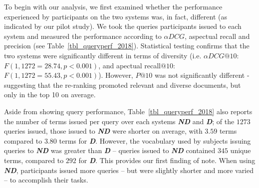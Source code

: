 To begin with our analysis, we first examined whether the performance experienced by participants on the two systems was, in fact, different (as indicated by our pilot study). We took the queries participants issued to each system and measured the performance according to $\alpha DCG$, aspectual recall and precision (see Table~\ref{tbl_queryperf_2018}). Statistical testing confirms that the two systems were significantly different 
 in terms of diversity (i.e. $\alpha DCG@10$: $F(1, 1272=28.74, p<0.001)$, and apectual recall$@10$: $F(1, 1272=55.43, p<0.001)$). However, $P@10$ was not significantly different - suggesting that the re-ranking promoted relevant and diverse documents, but only in the top 10 on average.
 
 Aside from showing query performance, Table~\ref{tbl_queryperf_2018} also reports the number of terms issued per query over each systems \textbf{\emph{ND}} and \textbf{\emph{D}}; of the $1273$ queries issued, those issued to \textbf{\emph{ND}} were shorter on average, with $3.59$ terms compared to $3.80$ terms for \textbf{\emph{D}}. However, the vocabulary used by subjects issuing queries to \textbf{\emph{ND}} was greater than \textbf{\emph{D}} -- queries issued to \textbf{\emph{ND}} contained $345$ unique terms, compared to $292$ for \textbf{\emph{D}}.
This provides our first finding of note. When using \textbf{\emph{ND}}, participants issued more queries -- but were slightly shorter and more varied -- to accomplish their tasks. 


